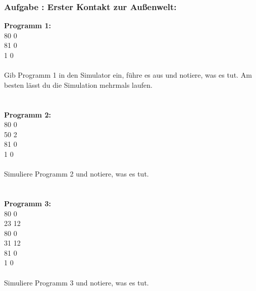 \documentclass[a4paper,12pt]{article}
\newcounter{aufgnr}
\begin{document}
\subsubsection*{Aufgabe \theaufgnr: Erster Kontakt zur Außenwelt:}
\textbf{Programm 1:}\\
80 0\\
81 0\\
1 0\\
\\
Gib Programm 1 in den Simulator ein, führe es aus und notiere, was es tut. Am besten lässt du die Simulation mehrmals laufen.\\
\\
\\
\textbf{Programm 2:}\\
80 0\\
50 2\\
81 0\\
1 0\\
\\
Simuliere Programm 2 und notiere, was es tut.\\
\\
\\
\textbf{Programm 3:}\\
80 0\\
23 12\\
80 0\\
31 12\\
81 0\\
1 0\\
\\
Simuliere Programm 3 und notiere, was es tut.\\
\\
\\
\\

\end{document}
